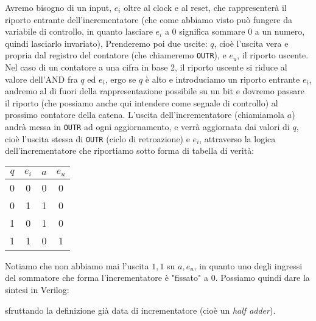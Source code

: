 \documentclass[a4paper,11pt]{article}
\begin{document}
Avremo bisogno di un input, $e_i$ oltre al clock e al reset, che rappresenterà il riporto entrante dell'incrementatore (che come abbiamo visto può fungere da variabile di controllo, in quanto lasciare $e_i$ a 0 significa sommare 0 a un numero, quindi lasciarlo invariato),
Prenderemo poi due uscite: $q$, cioè l'uscita vera e propria dal registro del contatore (che chiameremo \lstinline|OUTR|), e $e_u$, il riporto uscente.
Nel caso di un contatore a una cifra in base 2, il riporto uscente si riduce al valore dell'AND fra $q$ ed $e_i$, ergo se $q$ è alto e introduciamo un riporto entrante $e_i$, andremo al di fuori della rappresentazione possibile su un bit e dovremo passare il riporto (che possiamo anche qui intendere come segnale di controllo) al prossimo contatore della catena.
L'uscita dell'incrementatore (chiamiamola $a$) andrà messa in \lstinline|OUTR| ad ogni aggiornamento, e verrà aggiornata dai valori di $q$, cioè l'uscita stessa di \lstinline|OUTR| (ciclo di retroazione) e $e_i$, attraverso la logica dell'incrementatore che riportiamo sotto forma di tabella di verità:

\begin{table}[H]
	\center 
	\begin{tabular} { c c | c c }
		$q$ & $e_i$ & $a$ & $e_u$ \\ 
		\hline
		0 & 0 & 0 & 0 \\ 
		0 & 1 & 1 & 0 \\ 
		1 & 0 & 1 & 0 \\ 
		1 & 1 & 0 & 1 \\
	\end{tabular}
\end{table}

Notiamo che non abbiamo mai l'uscita $1, 1$ su $a, e_u$, in quanto uno degli ingressi del sommatore che forma l'incrementatore è "fissato" a 0.
Possiamo quindi dare la sintesi in Verilog:


sfruttando la definizione già data di incrementatore (cioè un \textit{half adder}).
\end{document}
